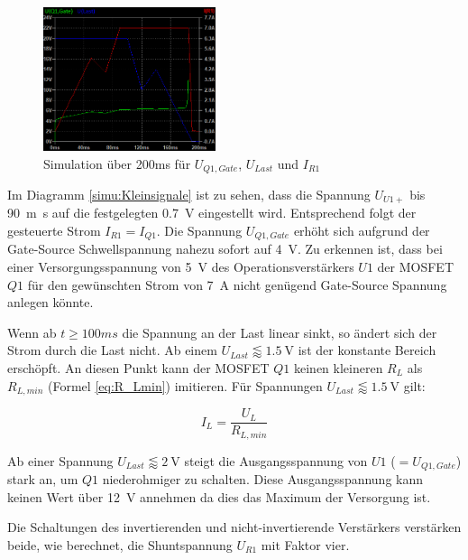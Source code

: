 \begin{figure}[!h]
	\centering
	\includegraphics[width=0.45\textwidth]{Bilder/Simu_grossignale.png}
	\renewcommand*\figurename{Diagramm}
	\caption{Simulation über 200ms für $U_{Q1,Gate}$, $U_{Last}$ und $I_{R1}$}
	\label{simu:Großsignale}
\end{figure}


Im Diagramm \ref{simu:Kleinsignale} ist zu sehen, dass die Spannung $U_{U1+}$ bis \SI{90}{m\second} 
auf die festgelegten \SI{0,7}{\volt} eingestellt wird. Entsprechend folgt der gesteuerte Strom $I_{R1} = I_{Q1}$.
Die Spannung $U_{Q1,Gate}$ erhöht sich aufgrund der Gate-Source Schwellspannung nahezu sofort auf \SI{4}{\volt}.
Zu erkennen ist, dass bei einer Versorgungsspannung von \SI{5}{\volt} des Operationsverstärkers $U1$ der 
MOSFET $Q1$ für den gewünschten Strom von \SI{7}{\ampere} nicht genügend Gate-Source Spannung anlegen könnte.

Wenn ab $t \geq 100ms$ die Spannung an der Last linear sinkt, so ändert sich der Strom durch die Last nicht.
Ab einem $U_{Last} \lessapprox \SI{1,5}{\volt}$ ist der konstante Bereich erschöpft. 
An diesen Punkt kann der MOSFET $Q1$ keinen kleineren $R_{L}$ als $R_{L,min}$ (Formel \ref{eq:R_Lmin}) imitieren.
Für Spannungen $U_{Last} \lessapprox \SI{1,5}{\volt}$ gilt:

\begin{equation}
	I_{L} = \frac{U_{L}}{R_{L,min}}
\end{equation}

Ab einer Spannung $U_{Last} \lessapprox \SI{2}{\volt}$ steigt die Ausgangsspannung von $U1$ ($= U_{Q1,Gate}$) stark an, 
um $Q1$ niederohmiger zu schalten.
Diese Ausgangsspannung kann keinen Wert über \SI{12}{\volt} annehmen da dies das Maximum der Versorgung ist.

Die Schaltungen des invertierenden und nicht-invertierende Verstärkers verstärken beide, wie berechnet, 
die Shuntspannung $U_{R1}$ mit Faktor vier.


